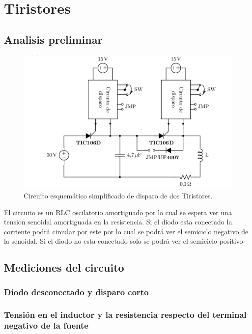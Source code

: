 \documentclass[a4paper,10pt]{article}
\begin{document}
\section{Tiristores}

\subsection{Analisis preliminar}

\begin{figure}[H] %
\begin{center}
\includegraphics[scale=0.5]{./imagenes/Circuito_Tiristores.png}
\caption{Circuito esquemático simplificado de disparo de dos Tiristores. }
 \label{fig:Circuito_tiristores}
\end{center}
\end{figure}

El circuito es un RLC oscilatorio amortiguado por lo cual se espera ver una tension senoidal amortiguada en la resistencia.
Si el diodo esta conectado la corriente podrá circular por este por lo cual se podrá ver el semiciclo negativo de la senoidal.
Si el diodo no esta conectado solo se podrá ver el semiciclo positivo   

\subsection{Mediciones del circuito}

\subsubsection{Diodo desconectado y disparo corto}

\subsubsection*{Tensión en el inductor y la resistencia respecto del terminal negativo de la fuente}
\end{document}
